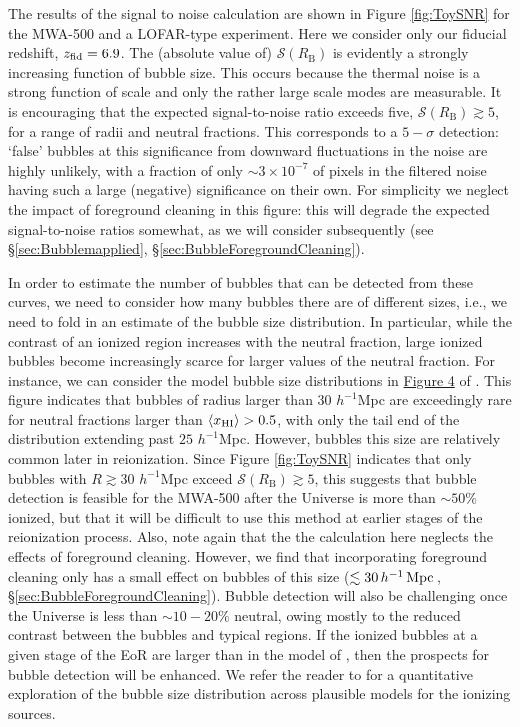 The results of the signal to noise calculation are shown in Figure
\ref{fig:ToySNR} for the MWA-500 and a LOFAR-type experiment. 
Here we consider only our
fiducial redshift, $z_{\rm fid} = 6.9$. The (absolute value of)
$\mathcal{S}(R_{\text{B}})$ is evidently a strongly increasing
function of bubble size. This occurs because the thermal noise is a
strong function of scale and only the rather large scale modes are
measurable. It is encouraging that the expected signal-to-noise ratio
exceeds five, $\mathcal{S}(R_{\text{B}}) \gtrsim 5$, for a range of
radii and neutral fractions. This corresponds to a $5-\sigma$
detection: `false' bubbles at this significance from downward
fluctuations in the noise are highly unlikely, with a fraction of 
only $\sim 3 \times 10^{-7}$ of pixels in the filtered noise having such a large
(negative) significance on their own. For simplicity we neglect
the impact of foreground cleaning in this figure: this will 
degrade the expected signal-to-noise ratios somewhat, as we will
consider subsequently (see \S \ref{sec:Bubblemapplied}, \S \ref{sec:BubbleForegroundCleaning}).

In order to estimate the number of bubbles that can be detected from these curves, we need to consider
how many bubbles there are of different sizes, i.e., we need to fold in an estimate of the bubble
size distribution. In particular, while the contrast of an ionized region increases with the
neutral fraction, large ionized bubbles become increasingly scarce for larger values of the neutral
fraction. For instance, we can consider the model bubble size distributions in
\href{http://iopscience.iop.org/0004-637X/654/1/12/fulltext/65071.fg4.html}{Figure
  4} of \cite{Zahn:2006sg}. This figure indicates that bubbles of radius larger than $30$ $h^{-1}$Mpc
are exceedingly rare for neutral fractions larger than $\langle x_{\rm HI}\rangle > 0.5$, with only
the tail end of the distribution extending past $25$ $h^{-1}$Mpc. However, bubbles this size
are relatively common later in reionization. Since Figure \ref{fig:ToySNR} indicates
that only bubbles with $R \gtrsim 30$ $h^{-1}$Mpc exceed $\mathcal{S}(R_{\text{B}}) \gtrsim 5$,
this suggests that bubble detection is feasible for the MWA-500 after the Universe is more than
$\sim 50\%$ ionized, but that it will be difficult to use this method at earlier
stages of the reionization process. Also, note again that the the calculation here neglects the effects of foreground cleaning. However, we find that incorporating foreground cleaning only has a small effect on bubbles of this size ($\lesssim 30\,h^{-1}\,{\rm Mpc}\,$, \S \ref{sec:BubbleForegroundCleaning}). Bubble detection will also be challenging once
the Universe is less than $\sim 10-20\%$ neutral, owing mostly to the reduced contrast
between the bubbles and typical regions. If the ionized bubbles at a given stage of the EoR are larger than in
the model of \cite{Zahn:2006sg}, then the prospects for bubble detection will be enhanced. We refer
the reader to \cite{McQuinn:2006et} for a quantitative exploration of the bubble size distribution across
plausible models for the ionizing sources.



